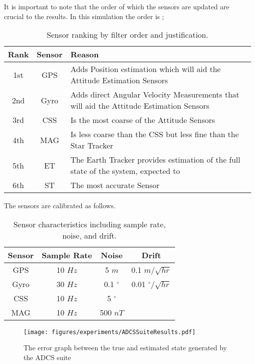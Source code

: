 It is important to note that the order of which the sensors are updated are crucial to the results. In this simulation the order is ;

\begin{table}[H]
\centering
\begin{tabular}{|c|c|p{8cm}|}  %
\hline
\textbf{Rank} & \textbf{Sensor} & \textbf{Reason} \\ \hline
1st & GPS  & Adds Position estimation which will aid the Attitude Estimation Sensors \\ \hline
2nd & Gyro & Adds direct Angular Velocity Measurements that will aid the Attitude Estimation Sensors \\ \hline
3rd & CSS  & Is the most coarse of the Attitude Sensors \\ \hline
4th & MAG  & Is less coarse than the CSS but less fine than the Star Tracker \\ \hline
5th & ET   & The Earth Tracker provides estimation of the full state of the system, expected to \\ \hline
6th & ST   & The most accurate Sensor \\ \hline
\end{tabular}
\caption{Sensor ranking by filter order and justification.}
\label{tab:sensor_rank}
\end{table}

The sensors are calibrated as follows.

\begin{table}[H]
\centering
\begin{tabular}{|c|c|c|c|}
\hline
\textbf{Sensor} & \textbf{Sample Rate} & \textbf{Noise} & \textbf{Drift} \\ \hline
GPS  &  10 $Hz$ & 5 $m$ & 0.1 $m/\sqrt{hr}$  \\ \hline
Gyro &  30 $Hz$ &  0.1 $^{\circ}$  & 0.01 $^{\circ}/\sqrt{hr}$ \\ \hline
CSS  &  10 $Hz$ &  5 $^{\circ}$ &   \\ \hline
MAG  &  10 $Hz$ &  500 $nT$ &  \\ \hline
\end{tabular}
\caption{Sensor characteristics including sample rate, noise, and drift.}
\label{tab:sensor_characteristics}
\end{table}


\begin{figure}[H]
    \centering
    \texttt{[image: figures/experiments/ADCSSuiteResults.pdf]}
    \caption{The error graph between the true and estimated state generated by the ADCS suite}
    \label{fig:ADCSSuite}
\end{figure}

